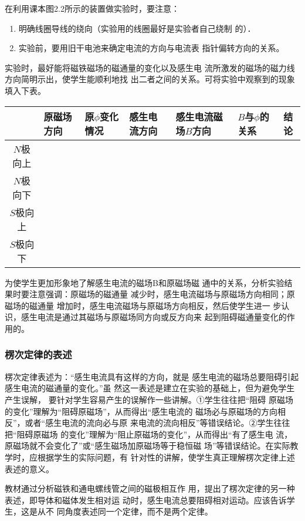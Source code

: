 在利用课本图2.2所示的装置做实验时，要注意：
\begin{enumerate}
\item 
明确线圈导线的绕向（实验用的线圈最好是实验者自己绕制
的）．   
 \item 实验前，要用旧干电池来确定电流的方向与电流表
指针偏转方向的关系。
\end{enumerate}

实验时，最好能将磁铁磁场的磁通量的变化以及感生电
流所激发的磁场的磁力线方向简明示出，使学生能顺利地找
出二者之间的关系。可将实验中观察到的现象填入下表。
\begin{center}
\begin{tabular}{c|p{}p{}p{}p{}p{}c}
    \hline
   & 原磁场方向  & 原$\phi$变化情况& 感生电流方向& 感生电流磁场$B$方向& $B$与$\phi$的关系& 结论\\
   \hline
   $N$极向上\\
   $N$极向下\\
   $S$极向上\\
   $S$极向下\\
   \hline
\end{tabular}
\end{center}

为使学生更加形象地了解感生电流的磁场B和原磁场磁
通中的关系，分析实验结果时要注意强调：原磁场的磁通量
减少时，感生电流磁场与原磁场方向相同；原磁场的磁通量
增加时，感生电流磁场与原磁场方向相反，然后使学生进一
步认识，感生电流是通过其磁场与原磁场同方向或反方向来
起到阻碍磁通量变化的作用的。

\subsubsection{楞次定律的表述}

楞次定律表述为：“感生电流具有这样的方向，就是
感生电流的磁场总要阻碍引起感生电流的磁通量的变化。”虽
然这一表述是建立在实验的基础上，但为避免学生产生误解，
要针对学生容易产生的误解作一些讲解。①学生往往把“阻碍
原磁场的变化”理解为“阻碍原磁场”，从而得出“感生电流的
磁场必与原磁场的方向相反”，或者“感生电流的流向必与原
来电流的流向相反”等错误结论。②学生往往把“阻碍原磁场
的变化”理解为“阻止原磁场的变化”，从而得出“有了感生电
流，原磁场就不会变化了”或“感生磁场加原磁场等于稳恒磁
场”等错误结论。在实际教学时，应根据学生的实际问题，有
针对性的讲解，使学生真正理解楞次定律上述表述的意义。

教材通过分析磁铁和通电螺线管之间的磁极相互作
用，提出了楞次定律的另一种表述，即导体和磁体发生相对运
动时，感生电流总要阻碍相对运动。应该告诉学生，这是从不
同角度表述同一个定律，而不是两个定律。

